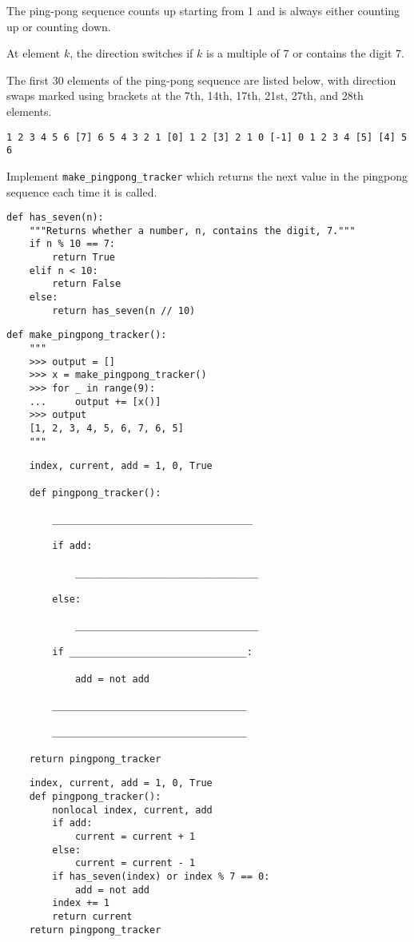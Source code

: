 \begin{blocksection}
\question The ping-pong sequence counts up starting from 1 and is always either counting up or counting down.

At element $k$, the direction switches if $k$ is a multiple of 7 or contains the digit 7.

The first 30 elements of the ping-pong sequence are listed below, with direction swaps marked using brackets at the 7th, 14th, 17th, 21st, 27th, and 28th elements.

\begin{verbatim}
1 2 3 4 5 6 [7] 6 5 4 3 2 1 [0] 1 2 [3] 2 1 0 [-1] 0 1 2 3 4 [5] [4] 5 6
\end{verbatim}

Implement \lstinline$make_pingpong_tracker$ which returns the next value in the pingpong sequence each time it is called.

\begin{lstlisting}
def has_seven(n):
    """Returns whether a number, n, contains the digit, 7."""
    if n % 10 == 7:
        return True
    elif n < 10:
        return False
    else:
        return has_seven(n // 10)
\end{lstlisting}

\begin{lstlisting}
def make_pingpong_tracker():
    """
    >>> output = []
    >>> x = make_pingpong_tracker()
    >>> for _ in range(9):
    ...     output += [x()]
    >>> output
    [1, 2, 3, 4, 5, 6, 7, 6, 5]
    """
\end{lstlisting}

\ifprintanswers\else
\begin{lstlisting}
    index, current, add = 1, 0, True

    def pingpong_tracker():

        ___________________________________

        if add:

            ________________________________

        else:

            ________________________________

        if _______________________________:

            add = not add

        __________________________________

        __________________________________

    return pingpong_tracker
\end{lstlisting}
\fi

\begin{solution}
\begin{lstlisting}
    index, current, add = 1, 0, True
    def pingpong_tracker():
        nonlocal index, current, add
        if add:
            current = current + 1
        else:
            current = current - 1
        if has_seven(index) or index % 7 == 0:
            add = not add
        index += 1
        return current
    return pingpong_tracker
\end{lstlisting}
\end{solution}
\end{blocksection}
